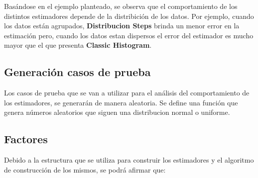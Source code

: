 \documentclass[10pt, a4paper,english,spanish,hidelinks]{article}
\begin{document}
Basándose en el ejemplo planteado, se observa que el comportamiento de los distintos estimadores
depende de la distribición de los datos.
Por ejemplo, cuando los datos están agrupados, \textbf{Distribucion Steps} brinda un menor
error en la estimación pero, cuando los datos estan dispersos el error del estimador es
mucho mayor que el que presenta \textbf{Classic Histogram}.


\subsection{Generación casos de prueba}
Los casos de prueba que se van a utilizar para el análisis del comportamiento de los
estimadores, se generarán de manera aleatoria. Se define una función que genera números
aleatorios que siguen una distribucion normal o uniforme.

\subsection{Factores}

Debido a la estructura que se utiliza para construir los estimadores y el algoritmo de
construcción de los mismos, se podrá afirmar que:
\end{document}
